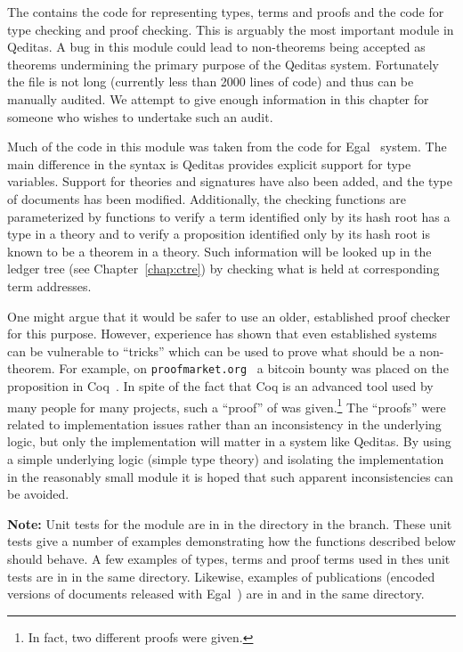 The  contains the code for representing types,
terms and proofs
and the code for type checking and proof checking.
This is arguably the most important module in Qeditas.
A bug in this module could lead to non-theorems being accepted as theorems
undermining the primary purpose of the Qeditas system.
Fortunately the  file is not long (currently less than 2000 lines of code)
and thus can be manually audited.
We attempt to give enough information in this chapter for someone who wishes to undertake such an audit.

Much of the code in this module was taken from the code for Egal~\cite{Brown2014} system.
The main difference in the syntax is Qeditas provides explicit support for type variables.
Support for theories and signatures have also been added, and the type of documents has been modified.
Additionally, the checking functions are parameterized by functions to verify a term
identified only by its hash root has a type in a theory
and to verify a proposition identified only by its hash root is known to be a theorem in a theory.
Such information will be looked up in the ledger tree (see Chapter~\ref{chap:ctre}) by checking what is held at corresponding term addresses.

One might argue that it would be safer to use an older, established proof checker for this purpose.
However, experience has shown that even established systems can be vulnerable to ``tricks''
which can be used to prove what should be a non-theorem.
For example, on {\tt{proofmarket.org}}~\cite{ProofMarket}
a bitcoin bounty was placed on the proposition {} in Coq~\cite{Coq:manual}.
In spite of the fact that Coq is an advanced tool used by many people for many projects,
such a ``proof'' of {} was given.\footnote{In fact, two different proofs were given.}
The ``proofs'' were related to implementation issues rather than an inconsistency
in the underlying logic, but only the implementation will matter in a system like Qeditas.
By using a simple underlying logic (simple type theory)
and isolating the implementation in the reasonably small module {}
it is hoped that such apparent inconsistencies can be avoided.

{\bf{Note:}} Unit tests for the {} module are in {}
in the {}
directory in the {} branch.
These unit tests give a number of examples demonstrating how the functions described below should behave.
A few examples of types, terms and proof terms used in thes unit tests are
in {} in the same directory.
Likewise, examples of publications (encoded versions of documents released with Egal~\cite{Brown2014}) are in
{} and {} in the same directory.

